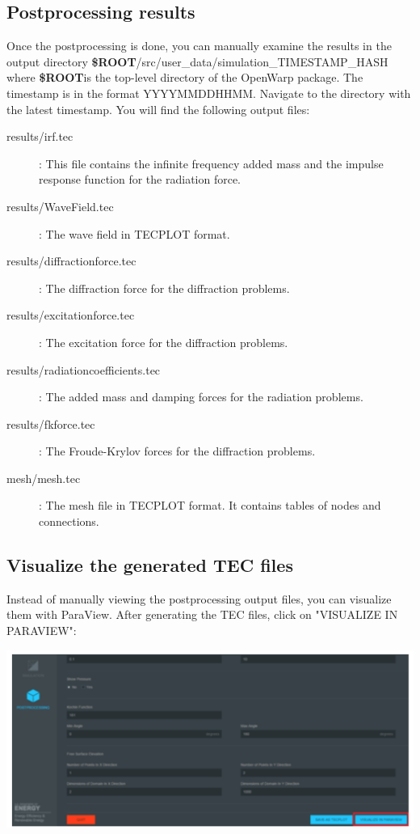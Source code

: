 \documentclass[12pt]{article}
\newcommand{\ROOT}{{\textbf{\$ROOT}}}
\begin{document}
\subsection{Postprocessing results}
Once the postprocessing is done, you can manually examine the results in the output directory \ROOT/src/user_data/simulation_TIMESTAMP_HASH where \ROOT is the top-level directory of the OpenWarp package.
The timestamp is in the format YYYYMMDDHHMM. Navigate to the directory with the latest timestamp. You will find the following output files:


\begin{description}
	\item [results/irf.tec]: This file contains the infinite frequency added mass and the impulse response function for the radiation force.
	\item [results/WaveField.tec]: The wave field in TECPLOT format.
	\item [results/diffractionforce.tec]: The diffraction force for the diffraction problems.
	\item [results/excitationforce.tec]: The excitation force for the diffraction problems.
	\item [results/radiationcoefficients.tec]: The added mass and damping forces for the radiation problems.
	\item [results/fkforce.tec]: The Froude-Krylov forces for the diffraction problems.
	\item [mesh/mesh.tec]: The mesh file in TECPLOT format. It contains tables of nodes and connections.
\end{description}


\subsection{Visualize the generated TEC files}

Instead of manually viewing the postprocessing output files, you can visualize them with ParaView. After generating the TEC files, click on "VISUALIZE IN PARAVIEW":

\vspace{\abovedisplayskip}
\begin{minipage}{\linewidth}
	\centering
	\includegraphics[scale=0.4]{img/37}
\end{minipage}
\vspace{\belowdisplayskip}
\end{document}
